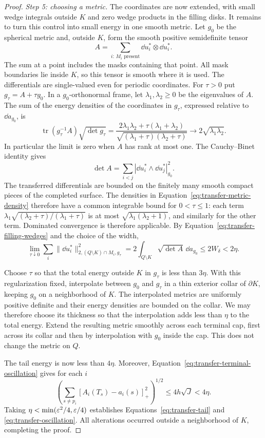 \begin{proof}
\smallskip\noindent
\emph{Step 5: choosing a metric.}
The coordinates are now extended, with small wedge integrals outside
$K$ and zero wedge products in the filling disks.  It remains to turn
this control into small energy in one smooth metric.
Let $g_0$ be the spherical metric and, outside $K$, form the smooth
positive semidefinite tensor
\[
 A=\sum_{i:\,M_i\text{ present}}\dd u_i^*\otimes\dd u_i^*.
\]
The sum at a point includes the masks containing that point.  All mask
boundaries lie inside $K$, so this tensor is smooth where it is used.
The differentials are single-valued even for periodic coordinates.
For $\tau>0$ put
$g_\tau=A+\tau g_0$.  In a $g_0$-orthonormal frame, let
$\lambda_1,\lambda_2\ge0$ be the eigenvalues of $A$.  The sum of the
energy densities of the coordinates in $g_\tau$, expressed relative
to $\dd a_{g_0}$, is
\begin{equation}\label{eq:transfer-metric-density}
 \operatorname{tr}(g_\tau^{-1}A)\sqrt{\det g_\tau}
 =\frac{2\lambda_1\lambda_2+\tau(\lambda_1+\lambda_2)}
        {\sqrt{(\lambda_1+\tau)(\lambda_2+\tau)}}
 \longrightarrow 2\sqrt{\lambda_1\lambda_2}.
\end{equation}
In particular the limit is zero when $A$ has rank at most one.
The Cauchy--Binet identity gives
\[
 \det A=\sum_{i<j}|\dd u_i^*\wedge\dd u_j^*|_{g_0}^2.
\]
The transferred differentials are bounded on the finitely many smooth
compact pieces of the completed surface.  The densities in
Equation~\eqref{eq:transfer-metric-density} therefore have a common
integrable bound for $0<\tau\le1$: each term
$\lambda_1\sqrt{(\lambda_2+\tau)/(\lambda_1+\tau)}$ is at most
$\sqrt{\lambda_1(\lambda_2+1)}$, and similarly for the other term.
Dominated convergence is therefore applicable.  By
Equation~\eqref{eq:transfer-filling-wedges} and the choice of the width,
\begin{equation}\label{eq:transfer-optimized-energy}
 \lim_{\tau\downarrow0}
       \sum_i\|\dd u_i^*\|_{2,(Q\setminus K)\cap M_i,g_\tau}^2
 =2\int_{Q\setminus K}\sqrt{\det A}\,\dd a_{g_0}
 \le2W_\delta<2\eta.
\end{equation}

Choose $\tau$ so that the total energy outside $K$ in $g_\tau$ is
less than $3\eta$.  With this regularization fixed, interpolate between
$g_0$ and $g_\tau$ in a thin exterior collar of $\partial K$, keeping
$g_0$ on a neighborhood of $K$.  The interpolated metrics are uniformly
positive definite and their energy densities are bounded on the
collar.  We may therefore choose its thickness so that the
interpolation adds less than $\eta$ to the total energy.  Extend the
resulting metric smoothly across each terminal cap, first across its
collar and then by interpolation with $g_0$ inside the cap.  This
does not change the metric on $Q$.

The tail energy is now less than $4\eta$.  Moreover,
Equation~\eqref{eq:transfer-terminal-oscillation} gives for each $i$
\[
 \left(\sum_{s\ne p_i}[A_i(T_s)-a_i(s)]_+^2\right)^{1/2}
 \le4h\sqrt J<4\eta.
\]
Taking $\eta<\min(\varepsilon^2/4,\varepsilon/4)$ establishes
Equations~\eqref{eq:transfer-tail} and
\eqref{eq:transfer-oscillation}.  All alterations occurred outside a
neighborhood of $K$, completing the proof.
\end{proof}

